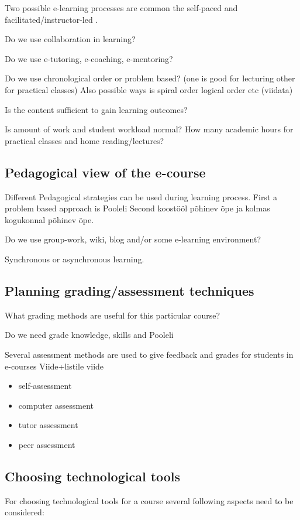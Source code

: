 Two possible e-learning processes are common the self-paced and facilitated/instructor-led \citep[p.~10]{food2011learning}.

Do we use collaboration in learning? 

Do we use  e-tutoring, e-coaching, e-mentoring?

Do we use chronological order or problem based? (one is good for lecturing other for practical classes) Also possible ways is spiral order logical order etc {\color{red} (viidata) }

Is the content sufficient to gain learning outcomes?

Is amount of work and student workload normal? How many academic hours for practical classes and home reading/lectures?

\subsection{Pedagogical view of the e-course}
Different Pedagogical strategies can be used during learning process. First a problem based approach is {\color{red} Pooleli }
Second koostööl põhinev õpe ja kolmas kogukonnal põhinev õpe.

Do we use group-work, wiki, blog and/or some e-learning environment?

Synchronous or asynchronous learning.

\subsection{Planning grading/assessment techniques}
What grading methods are useful for this particular course?

Do we need grade knowledge, skills and {\color{red} Pooleli }

Several assessment methods are used to give feedback and grades for students in e-courses {\color{red} Viide+listile viide }

\begin{itemize}
	\item self-assessment
	\item computer assessment
	\item tutor assessment
	\item peer assessment
\end{itemize}
\subsection{Choosing technological tools}
For choosing technological tools for a course several following aspects need to be considered:

